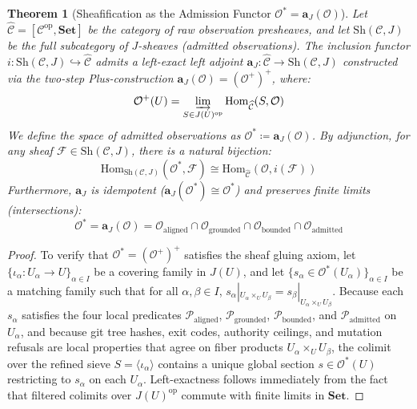 \documentclass[10pt,twoside,openany]{book}
\theoremstyle{plain}
\newtheorem{theorem}{Theorem}[chapter]
\theoremstyle{definition}
\theoremstyle{remark}
\newcommand{\Oraw}{\mathcal{O}}
\newcommand{\Oadm}{\mathcal{O}^*}
\begin{document}
\begin{theorem}[Sheafification as the Admission Functor $\Oadm = \mathbf{a}_J(\Oraw)$]
Let $\widehat{\mathcal{C}} = [\mathcal{C}^{\mathrm{op}}, \mathbf{Set}]$ be the category of raw observation presheaves, and let $\mathrm{Sh}(\mathcal{C}, J)$ be the full subcategory of $J$-sheaves (admitted observations). The inclusion functor $i: \mathrm{Sh}(\mathcal{C}, J) \hookrightarrow \widehat{\mathcal{C}}$ admits a left-exact left adjoint $\mathbf{a}_J: \widehat{\mathcal{C}} \to \mathrm{Sh}(\mathcal{C}, J)$ constructed via the two-step Plus-construction $\mathbf{a}_J(\Oraw) = (\Oraw^+)^+$, where:
\begin{equation}
\Oraw^+(U) = \varinjlim_{S \in J(U)^{\mathrm{op}}} \mathrm{Hom}_{\widehat{\mathcal{C}}}(S, \Oraw)
\end{equation}
We define the space of admitted observations as $\Oadm \coloneqq \mathbf{a}_J(\Oraw)$. By adjunction, for any sheaf $\mathcal{F} \in \mathrm{Sh}(\mathcal{C}, J)$, there is a natural bijection:
\begin{equation}
\mathrm{Hom}_{\mathrm{Sh}(\mathcal{C}, J)}(\Oadm, \mathcal{F}) \cong \mathrm{Hom}_{\widehat{\mathcal{C}}}(\Oraw, i(\mathcal{F}))
\end{equation}
Furthermore, $\mathbf{a}_J$ is idempotent ($\mathbf{a}_J(\Oadm) \cong \Oadm$) and preserves finite limits (intersections):
\begin{equation}
\Oadm = \mathbf{a}_J(\Oraw) = \Oraw_{\mathrm{aligned}} \cap \Oraw_{\mathrm{grounded}} \cap \Oraw_{\mathrm{bounded}} \cap \Oraw_{\mathrm{admitted}}
\end{equation}
\end{theorem}
\begin{proof}
To verify that $\Oadm = (\Oraw^+)^+$ satisfies the sheaf gluing axiom, let $\{ \iota_\alpha: U_\alpha \to U \}_{\alpha \in I}$ be a covering family in $J(U)$, and let $\{ s_\alpha \in \Oadm(U_\alpha) \}_{\alpha \in I}$ be a matching family such that for all $\alpha, \beta \in I$, $s_\alpha|_{U_\alpha \times_U U_\beta} = s_\beta|_{U_\alpha \times_U U_\beta}$. Because each $s_\alpha$ satisfies the four local predicates $\mathcal{P}_{\mathrm{aligned}}$, $\mathcal{P}_{\mathrm{grounded}}$, $\mathcal{P}_{\mathrm{bounded}}$, and $\mathcal{P}_{\mathrm{admitted}}$ on $U_\alpha$, and because git tree hashes, exit codes, authority ceilings, and mutation refusals are local properties that agree on fiber products $U_\alpha \times_U U_\beta$, the colimit over the refined sieve $S = \langle \iota_\alpha \rangle$ contains a unique global section $s \in \Oadm(U)$ restricting to $s_\alpha$ on each $U_\alpha$. Left-exactness follows immediately from the fact that filtered colimits over $J(U)^{\mathrm{op}}$ commute with finite limits in $\mathbf{Set}$.
\end{proof}
\end{document}
